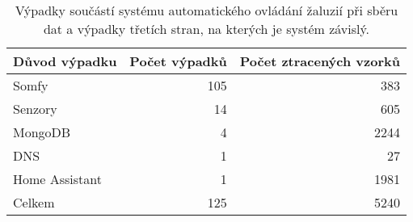 \begin{table}[htbp]
  \centering
  \begin{tabular}{l|r|r}
    \toprule
    Důvod výpadku & \multicolumn{1}{l|}{Počet výpadků} & \multicolumn{1}{l}{Počet ztracených vzorků} \\
    \midrule
    \midrule
    Somfy & 105   & 383 \\
    \midrule
    Senzory & 14    & 605 \\
    \midrule
    MongoDB & 4     & 2244 \\
    \midrule
    DNS   & 1     & 27 \\
    \midrule
    Home Assistant & 1     & 1981 \\
    \midrule
    Celkem & 125   & 5240 \\
    \bottomrule
    \bottomrule
    \end{tabular}%
  \caption[Výpadky]{Výpadky součástí systému automatického ovládání žaluzií při sběru dat a výpadky třetích stran, na kterých je systém závislý.}
  \label{tab:outages}%
\end{table}%
